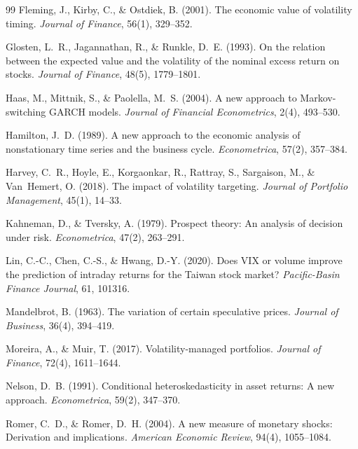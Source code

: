 \documentclass[12pt,a4paper]{article}
\begin{document}
\begin{thebibliography}{99}
Fleming, J., Kirby, C., \& Ostdiek, B. (2001). The economic value of volatility timing. \textit{Journal of Finance}, 56(1), 329--352.

Glosten, L.~R., Jagannathan, R., \& Runkle, D.~E. (1993). On the relation between the expected value and the volatility of the nominal excess return on stocks. \textit{Journal of Finance}, 48(5), 1779--1801.

Haas, M., Mittnik, S., \& Paolella, M.~S. (2004). A new approach to Markov-switching GARCH models. \textit{Journal of Financial Econometrics}, 2(4), 493--530.

Hamilton, J.~D. (1989). A new approach to the economic analysis of nonstationary time series and the business cycle. \textit{Econometrica}, 57(2), 357--384.

Harvey, C.~R., Hoyle, E., Korgaonkar, R., Rattray, S., Sargaison, M., \& Van~Hemert, O. (2018). The impact of volatility targeting. \textit{Journal of Portfolio Management}, 45(1), 14--33.

Kahneman, D., \& Tversky, A. (1979). Prospect theory: An analysis of decision under risk. \textit{Econometrica}, 47(2), 263--291.

Lin, C.-C., Chen, C.-S., \& Hwang, D.-Y. (2020). Does VIX or volume improve the prediction of intraday returns for the Taiwan stock market? \textit{Pacific-Basin Finance Journal}, 61, 101316.

Mandelbrot, B. (1963). The variation of certain speculative prices. \textit{Journal of Business}, 36(4), 394--419.

Moreira, A., \& Muir, T. (2017). Volatility-managed portfolios. \textit{Journal of Finance}, 72(4), 1611--1644.

Nelson, D.~B. (1991). Conditional heteroskedasticity in asset returns: A new approach. \textit{Econometrica}, 59(2), 347--370.

Romer, C.~D., \& Romer, D.~H. (2004). A new measure of monetary shocks: Derivation and implications. \textit{American Economic Review}, 94(4), 1055--1084.

\end{thebibliography}
\end{document}
